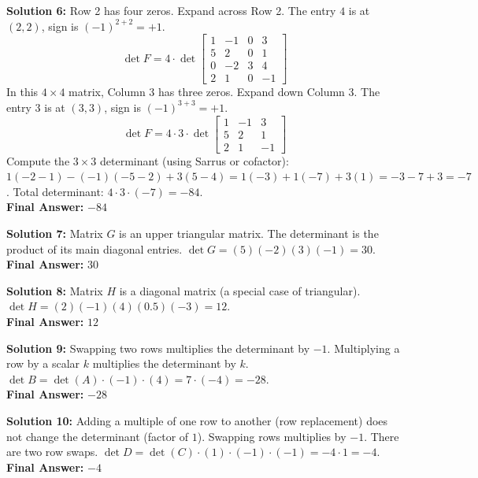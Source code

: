 \documentclass[11pt]{article}
\begin{document}
\vspace{0.5cm}
\textbf{Solution 6:}
Row 2 has four zeros. Expand across Row 2. The entry $4$ is at $(2,2)$, sign is $(-1)^{2+2} = +1$.
$$\det F = 4 \cdot \det \begin{bmatrix} 1 & -1 & 0 & 3 \\ 5 & 2 & 0 & 1 \\ 0 & -2 & 3 & 4 \\ 2 & 1 & 0 & -1 \end{bmatrix}$$
In this $4 \times 4$ matrix, Column 3 has three zeros. Expand down Column 3. The entry $3$ is at $(3,3)$, sign is $(-1)^{3+3} = +1$.
$$\det F = 4 \cdot 3 \cdot \det \begin{bmatrix} 1 & -1 & 3 \\ 5 & 2 & 1 \\ 2 & 1 & -1 \end{bmatrix}$$
Compute the $3 \times 3$ determinant (using Sarrus or cofactor):
$1(-2 - 1) - (-1)(-5 - 2) + 3(5 - 4) = 1(-3) + 1(-7) + 3(1) = -3 - 7 + 3 = -7$.
Total determinant: $4 \cdot 3 \cdot (-7) = -84$. \\
\textbf{Final Answer:} $-84$

\vspace{0.5cm}
\textbf{Solution 7:}
Matrix $G$ is an upper triangular matrix. The determinant is the product of its main diagonal entries.
$\det G = (5)(-2)(3)(-1) = 30$. \\
\textbf{Final Answer:} $30$

\vspace{0.5cm}
\textbf{Solution 8:}
Matrix $H$ is a diagonal matrix (a special case of triangular).
$\det H = (2)(-1)(4)(0.5)(-3) = 12$. \\
\textbf{Final Answer:} $12$

\vspace{0.5cm}
\textbf{Solution 9:}
Swapping two rows multiplies the determinant by $-1$. Multiplying a row by a scalar $k$ multiplies the determinant by $k$.
$\det B = \det(A) \cdot (-1) \cdot (4) = 7 \cdot (-4) = -28$. \\
\textbf{Final Answer:} $-28$

\vspace{0.5cm}
\textbf{Solution 10:}
Adding a multiple of one row to another (row replacement) does not change the determinant (factor of $1$). Swapping rows multiplies by $-1$. There are two row swaps.
$\det D = \det(C) \cdot (1) \cdot (-1) \cdot (-1) = -4 \cdot 1 = -4$. \\
\textbf{Final Answer:} $-4$
\end{document}
